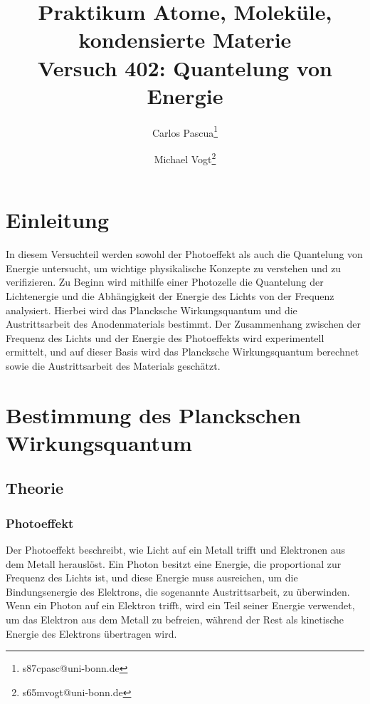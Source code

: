 \documentclass{article}
\title{Praktikum Atome, Moleküle, kondensierte Materie \\ Versuch 402: Quantelung von Energie}
\author[1]{Carlos Pascua\thanks{s87cpasc@uni-bonn.de}}
\author[1]{Michael Vogt\thanks{s65mvogt@uni-bonn.de}}
\affil[1]{Uni Bonn}
\begin{document}
\maketitle
\tableofcontents
\newpage
{}

\pagestyle{fancy}
\fancyhead[R]{\thepage}
\fancyhead[L]{\leftmark}

\section*{Einleitung}

In diesem Versuchteil werden sowohl der Photoeffekt als auch die Quantelung von Energie untersucht, um wichtige
 physikalische Konzepte zu verstehen und zu verifizieren. Zu Beginn wird mithilfe einer Photozelle 
 die Quantelung der Lichtenergie und die Abhängigkeit der Energie des Lichts von der Frequenz 
 analysiert. Hierbei wird das Plancksche Wirkungsquantum und die Austrittsarbeit des 
 Anodenmaterials bestimmt. Der Zusammenhang zwischen der Frequenz des Lichts und der Energie des 
 Photoeffekts wird experimentell ermittelt, und auf dieser Basis wird das Plancksche Wirkungsquantum 
 berechnet sowie die Austrittsarbeit des Materials geschätzt.
\section{Bestimmung des Planckschen Wirkungsquantum}
  \subsection{Theorie}

    \subsubsection{Photoeffekt}
    Der Photoeffekt beschreibt, wie Licht auf ein Metall trifft und Elektronen aus dem Metall
     herauslöst. Ein Photon besitzt eine Energie, die proportional zur Frequenz des Lichts ist, 
     und diese Energie muss ausreichen, um die Bindungsenergie des Elektrons, die sogenannte 
     Austrittsarbeit, zu überwinden. Wenn ein Photon auf ein Elektron trifft, wird ein Teil 
     seiner Energie verwendet, um das Elektron aus dem Metall zu befreien, während der Rest 
     als kinetische Energie des Elektrons übertragen wird. 
       
\end{document}
